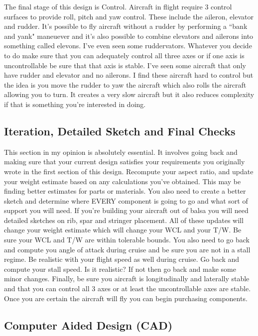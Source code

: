 The final stage of this design is Control. Aircraft in flight require
3 control surfaces to provide roll, pitch and yaw control. These
include the aileron, elevator and rudder. It's possible to fly
aircraft without a rudder by performing a ``bank and yank" maneuever
and it's also possible to combine elevators and ailerons into
something called elevons. I've even seen some ruddervators. Whatever
you decide to do make sure that you can adequately control all three
axes or if one axis is uncontrollable be sure that that axis is
stable. I've seen some aircraft that only have rudder and elevator and
no ailerons. I find these aircraft hard to control but the idea is you
move the rudder to yaw the aircraft which also rolls the aircraft
allowing you to turn. It creates a very slow aircraft but it also
reduces complexity if that is something you're interested in doing.

\subsection{Iteration, Detailed Sketch and Final Checks}

This section in my opinion is absolutely essential. It involves going
back and making sure that your current design satisfies your
requirements you originally wrote in the first section of this
design. Recompute your aspect ratio, and update your weight estimate
based on any calculations you've obtained. This may be finding better
estimates for parts or materials. You also need to create a better
sketch and determine where EVERY component is going to go and what
sort of support you will need. If you're building your aircraft out of
balsa you will need detailed sketches on rib, spar and stringer
placement. All of these updates will change your weight estimate which
will change your WCL and your T/W. Be sure your WCL and T/W are within
tolerable bounds. You also need to go back and compute you angle of
attack during cruise and be sure you are not in a stall regime. Be
realistic with your flight speed as well during cruise. Go back and
compute your stall speed. Is it realistic? If not then go back and
make some minor changes. Finally, be sure you aircraft is
longitudinally and laterally stable and that you can control all 3
axes or at least the uncontrollable axes are stable. Once you are
certain the aircraft will fly you can begin purchasing components. 

\subsection{Computer Aided Design (CAD)}

